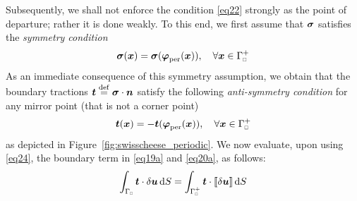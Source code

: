 \documentclass{bmcart}
\newcommand{\figref}[1]{Figure~\ref{#1}}
\newcommand{\eqtref}[1]{\eqref{#1}}
\DeclarePairedDelimiter{\jmp}{[\![}{]\!]}
\newcommand{\per}{\mathrm{per}}
\newcommand{\rve}{
  {\mathchoice
   {\mbox{\scalebox{0.67}{$\Box$}}}
   {\mbox{\scalebox{0.67}{$\Box$}}}
   {\mbox{\scalebox{0.5}{$\Box$}}}
   {\mbox{\scalebox{0.375}{$\Box$}}}
  }
}
\begin{document}
Subsequently, we shall not enforce the condition \eqtref{eq22} strongly as the point of departure; rather it is done weakly.
To this end, we first assume that $\boldsymbol{\sigma}$ satisfies the \emph{symmetry condition}
\begin{equation}
    \ts{\sigma}(\ta{x}) = \ts{\sigma}(\ta{\varphi}_\per(\ta{x})), \quad
    \forall \ta{x}\in\Gamma_\rve^+
\label{eq23}
\end{equation}
As an immediate consequence of this symmetry assumption, we obtain that the boundary tractions $\boldsymbol{t}\overset{\mathrm{def}}{=}\boldsymbol{\sigma}\cdot\boldsymbol{n}$ satisfy the following \emph{anti-symmetry condition} for any mirror point (that is not a corner point)
\begin{equation}
    \ta{t}(\ta{x}) = -\ta{t}(\ta{\varphi}_\per(\ta{x})), \quad
    \forall \ta{x}\in\Gamma_\rve^+
\label{eq24}
\end{equation}
as depicted in \figref{fig:swisscheese_periodic}.
We now evaluate, upon using \eqtref{eq24}, the boundary term in \eqtref{eq19a} and \eqtref{eq20a}, as follows:
\begin{equation}
    \int_{\Gamma_\rve} \ta{t} \cdot \delta \ta{u} \dif S =
    \int_{\Gamma_\rve^+} \ta{t} \cdot \jmp{\delta \ta{u}} \dif S
\label{eq25}
\end{equation}
\end{document}
